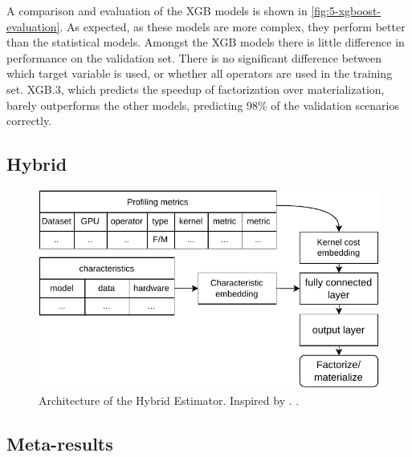 A comparison and evaluation of the XGB models is shown in \autoref{fig:5-xgboost-evaluation}. As expected, as these models are more complex, they perform better than the statistical models. Amongst the XGB models there is little difference in performance on the validation set. There is no significant difference between which target variable is used, or whether all operators are used in the training set. XGB.3, which predicts the speedup of factorization over materialization, barely outperforms the other models, predicting 98\% of the validation scenarios correctly.

\subsection{Hybrid}

\begin{figure}
    \centering
    \includegraphics[width=0.7\linewidth]{chapters/05_cost_estimation/figures/hybrid-architecture.pdf}
    \caption[Hybrid Estimator Architecture]{Architecture of the Hybrid Estimator. Inspired by \cite{halide_cost_model}. .}
    \label{fig:5-hybrid-architecture}
\end{figure}

\subsection{Meta-results}

